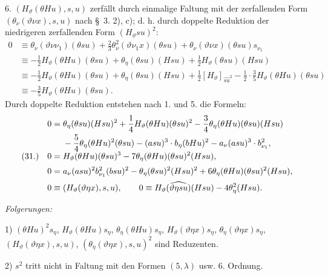 6. $(H_\vartheta(\theta Hu),s,u)$ zerfällt durch einmalige Faltung mit der zerfallenden Form $(\theta_\nu(\vartheta \nu x),s,u)$ nach \S\ 3. 2), c); d. h. durch doppelte Reduktion der niedrigeren zerfallenden Form $(H_\vartheta su)^2$:
\[
\begin{aligned}
0&\equiv \theta_\nu(\vartheta\nu\nu_1)(\theta su)+\frac23\theta_\nu^2(\vartheta \nu_1 x)(\theta su)+\theta_\nu(\vartheta \nu x)(\theta su)s_{\nu_1}\\
&\equiv -\frac12H_\vartheta(\theta Hu)(\theta su)+\theta_\eta(\theta su)(Hsu)+\frac12H_\vartheta(\theta su)(Hsu)\\
&\equiv -\frac12H_\vartheta(\theta Hu)(\theta su)+\theta_\eta(\theta su)(Hsu)+\frac12[H_\vartheta]_{\widehat{su}^2}-\frac12\cdot\frac35H_\vartheta(\theta Hu)(\theta su)\\
&\equiv -\frac35H_\vartheta(\theta Hu)(\theta su).
\end{aligned}
\]
Durch doppelte Reduktion entstehen nach 1. und 5. die Formeln:
\[
\begin{array}{@{}r@{\quad}l@{}}
&\displaystyle
\begin{aligned}
0={}&\theta_\eta(\theta su)(Hsu)^2+\frac14H_\vartheta(\theta Hu)(\theta su)^2-\frac34\theta_\eta(\theta Hu)(\theta su)(Hsu)\\
&-\frac54\theta_\eta(\theta Hu)^2(\theta su)-(asu)^3\cdot b_\eta(bHu)^2-a_\nu(asu)^3\cdot b_{\nu_1}^2,
\end{aligned}\\[0.55em]
(31.)&\displaystyle 0=H_\vartheta(\theta Hu)(\theta su)^3-7\theta_\eta(\theta Hu)(\theta su)^2(Hsu),\\[0.55em]
&\displaystyle 0=a_\nu(asu)^2b_{\nu_1}^{2}(bsu)^2-\theta_\eta(\theta su)^2(Hsu)^2+6\theta_\eta(\theta Hu)(\theta su)^2(Hsu),\\[0.55em]
&\displaystyle 0\equiv (H_\vartheta(\vartheta\eta x),s,u),\qquad
0\equiv H_\vartheta(\widehat{\vartheta\eta su})(Hsu)-4\theta_\eta^2(Hsu).
\end{array}
\]

\noindent\emph{Folgerungen:}

1) $(\theta Hu)^2s_\eta$, $H_\vartheta(\theta Hu)s_\eta$, $\theta_\eta(\theta Hu)s_\eta$, $H_\vartheta(\vartheta\eta x)s_\eta$, $\theta_\eta(\vartheta\eta x)s_\eta$, $(H_\vartheta(\vartheta\eta x),s,u)$, $(\theta_\eta(\vartheta\eta x),s,u)^2$ sind Reduzenten.

2) $s^2$ tritt nicht in Faltung mit den Formen $(5,\lambda)$ usw. 6. Ordnung.

